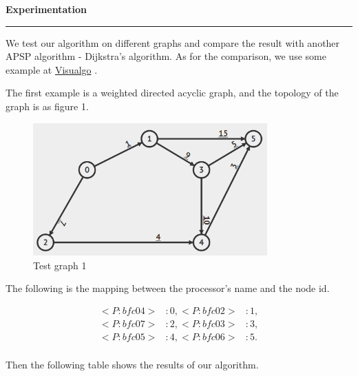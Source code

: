 \documentclass[11pt]{article}  %
\begin{document}
{\bf Experimentation}

\rule{6in}{.1pt}       %

We test our algorithm on different graphs and compare the result with another APSP algorithm - Dijkstra's algorithm. As for the comparison, we use some example at \href{https://visualgo.net/en/sssp}{Visualgo} .\par

The first example is a weighted directed acyclic graph, and the topology of the graph is as figure 1.

\begin{figure}[ht]
\centering
\includegraphics[width=9cm]{dag/0.png}
\caption{Test graph 1}
\end{figure}\par

The following is the mapping between the processor's name and the node id.\par

\begin{equation}\nonumber
\begin{aligned}
<P:bfc04>&: 0,
<P:bfc02>&: 1, \\
<P:bfc07>&: 2,
<P:bfc03>&: 3, \\
<P:bfc05>&: 4,
<P:bfc06>&: 5. \\
\end{aligned}
\end{equation}\par
Then the following table shows the results of our algorithm.\par
\end{document}
